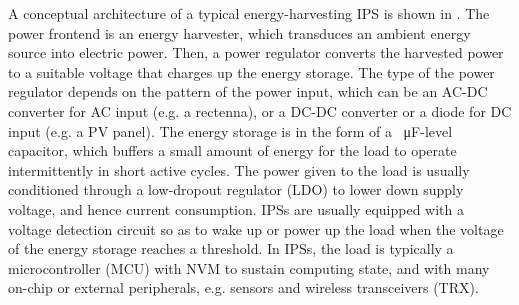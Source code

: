 \needref
A conceptual architecture of a typical energy-harvesting IPS is shown in .
The power frontend is an energy harvester, which transduces an ambient energy source into electric power. 
Then, a power regulator converts the harvested power to a suitable voltage that charges up the energy storage.
The type of the power regulator depends on the pattern of the power input, which can be an AC-DC converter for AC input (e.g. a rectenna), or a DC-DC converter or a diode for DC input (e.g. a PV panel). 
The energy storage is in the form of a \SI{}{\micro\farad}-level capacitor, which buffers a small amount of energy for the load to operate intermittently in short active cycles.
The power given to the load is usually conditioned through a low-dropout regulator (LDO) to lower down supply voltage, and hence current consumption. 
IPSs are usually equipped with a voltage detection circuit so as to wake up or power up the load when the voltage of the energy storage reaches a threshold. 
In IPSs, the load is typically a microcontroller (MCU) with NVM to sustain computing state, and with many on-chip or external peripherals, e.g. sensors and wireless transceivers (TRX). 





